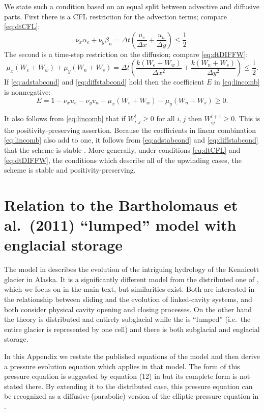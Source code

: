\documentclass[11pt,final]{amsart}
\newcommand{\Wlij}{W^l_{i,j}}
\begin{document}
We state such a condition based on an equal split between advective and diffusive parts.  First there is a CFL restriction for the advection terms; compare \eqref{eq:dtCFL}:
\begin{equation}
\nu_x \alpha_e + \nu_y \beta_n = \Delta t \left(\frac{u_e}{\Delta x} + \frac{u_n}{\Delta y}\right) \le \frac{1}{2}. \label{eq:adstabcond}
\end{equation}
The second is a time-step restriction on the diffusion; compare \eqref{eq:dtDIFFW}:
\begin{equation}
\mu_x (W_e + W_w) + \mu_y (W_n + W_s) = \Delta t \left(\frac{k (W_e + W_w)}{\Delta x^2} + \frac{k (W_n + W_s)}{\Delta y^2}\right) \le \frac{1}{2}. \label{eq:diffstabcond}
\end{equation}
If \eqref{eq:adstabcond} and \eqref{eq:diffstabcond} hold then the coefficient $E$ in \eqref{eq:lincomb} is nonnegative:
	$$E = 1 - \nu_x u_e - \nu_y v_n - \mu_x (W_e + W_w) - \mu_y (W_n + W_s) \ge 0.$$

It also follows from \eqref{eq:lincomb} that if $\Wlij\ge 0$ for all $i,j$ then $W_{ij}^{l+1}\ge 0$.  This is the positivity-preserving assertion.  Because the coefficients in linear combination \eqref{eq:lincomb} also add to one, it follows  from \eqref{eq:adstabcond} and \eqref{eq:diffstabcond} that the scheme is stable \citep{MortonMayers}.  More generally, under conditions \eqref{eq:dtCFL} and \eqref{eq:dtDIFFW}, the conditions which describe all of the upwinding cases, the scheme is stable and positivity-preserving.


\section{Relation to the Bartholomaus et al.~(2011) ``lumped'' model with englacial storage}  The model in \cite{Bartholomausetal2011} describes the evolution of the intriguing hydrology of the Kennicott glacier in Alaska.  It is a significantly different model from the distributed one of \cite{Schoofetal2012}, which we focus on in the main text, but similarities exist.  Both are interested in the relationship between sliding and the evolution of linked-cavity systems, and both consider physical cavity opening and closing processes.  On the other hand the \cite{Schoofetal2012} theory is distributed and entirely subglacial while the \cite{Bartholomausetal2011} is ``lumped'' (i.e.~the entire glacier is represented by one cell) and there is both subglacial and englacial storage.

In this Appendix we restate the published equations of the \cite{Bartholomausetal2011} model and then derive a pressure evolution equation which applies in that model.  The form of this pressure equation is suggested by equation (12) in \cite{Bartholomausetal2011} but its complete form is not stated there.  By extending it to the distributed case, this pressure equation can be recognized as a diffusive (parabolic) version of the elliptic pressure equation in \cite{Schoofetal2012}.
\end{document}
